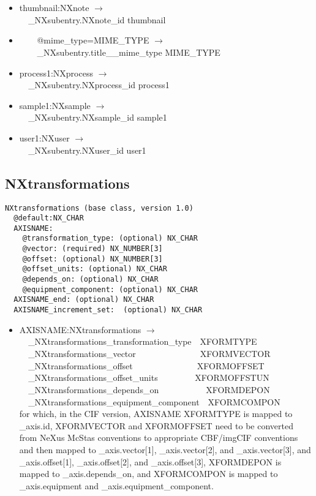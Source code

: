 \documentclass[11pt]{article}
\begin{document}
{{\begin{itemize}
\item{thumbnail:NXnote $\rightarrow$\\
\verb|  |\_NXsubentry.NXnote\_id thumbnail}

\item{\verb|    |@mime\_type=MIME\_TYPE $\rightarrow$\\
\verb|    |\_NXsubentry.title\_\_mime\_type MIME\_TYPE}

\item{process1:NXprocess $\rightarrow$\\
\verb|  |\_NXsubentry.NXprocess\_id process1}

\item{sample1:NXsample $\rightarrow$\\
\verb|  |\_NXsubentry.NXsample\_id sample1}

\item{user1:NXuser $\rightarrow$\\
\verb|  |\_NXsubentry.NXuser\_id user1}
\end{itemize}

\subsection{NXtransformations}

\begin{verbatim}
NXtransformations (base class, version 1.0)
  @default:NX_CHAR
  AXISNAME:
    @transformation_type: (optional) NX_CHAR
    @vector: (required) NX_NUMBER[3]
    @offset: (optional) NX_NUMBER[3]
    @offset_units: (optional) NX_CHAR
    @depends_on: (optional) NX_CHAR
    @equipment_component: (optional) NX_CHAR
  AXISNAME_end: (optional) NX_CHAR
  AXISNAME_increment_set:  (optional) NX_CHAR
\end{verbatim}

\begin{itemize}

\item{AXISNAME:NXtransformations $\rightarrow$\\
\verb|  |\_NXtransformations\_transformation\_type~~XFORMTYPE\\
\verb|  |\_NXtransformations\_vector~~~~~~~~~~~~~~~XFORMVECTOR\\
\verb|  |\_NXtransformations\_offset~~~~~~~~~~~~~~~XFORMOFFSET\\
\verb|  |\_NXtransformations\_offset\_units~~~~~~~~ XFORMOFFSTUN\\
\verb|  |\_NXtransformations\_depends\_on~~~~~~~~~~~XFORMDEPON\\
\verb|  |\_NXtransformations\_equipment\_component~~XFORMCOMPON\\
for which, in the CIF version, AXISNAME XFORMTYPE is mapped to
\_axis.id, XFORMVECTOR and XFORMOFFSET need to be converted
from NeXus McStas conventions to appropriate CBF/imgCIF conventions
and then mapped to \_axis.vector[1], \_axis.vector[2], and
\_axis.vector[3], and \_axis.offset[1], \_axis.offset[2], and
\_axis.offset[3], XFORMDEPON is mapped to \_axis.depends\_on, and
XFORMCOMPON is mapped to \_axis.equipment and \_axis.equipment\_component.
}
\end{itemize}


}}
\end{document}
